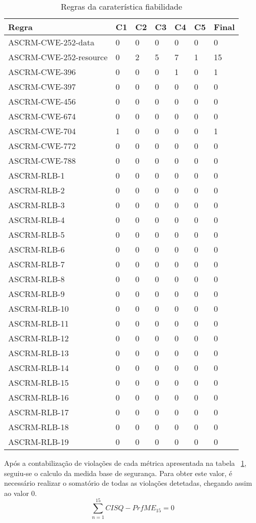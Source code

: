 \documentclass[openany,10pt,a4paper]{article}
\begin{document}
\begin{longtable}{p{1.9in}|p{0.28in}|p{0.28in}|p{0.28in}|p{0.28in}|p{0.28in}|p{0.35in}}
	\caption{Regras da caraterística fiabilidade}
	\label{table_Reliability}
	\endhead
	\hline	
		\textbf{Regra} & \textbf{C1} & \textbf{C2} & \textbf{C3} & \textbf{C4} & \textbf{C5} & \textbf{Final} \\ \hline
ASCRM-CWE-252-data & 0 & 0 & 0 & 0 & 0 & 0 \\ \hline
ASCRM-CWE-252-resource & 0 & 2 & 5 & 7 & 1 & 15 \\ \hline
ASCRM-CWE-396 & 0 & 0 & 0 & 1 & 0 & 1 \\ \hline
ASCRM-CWE-397 & 0 & 0 & 0 & 0 & 0 & 0 \\ \hline
ASCRM-CWE-456 & 0 & 0 & 0 & 0 & 0 & 0 \\ \hline
ASCRM-CWE-674 & 0 & 0 & 0 & 0 & 0 & 0 \\ \hline
ASCRM-CWE-704 & 1 & 0 & 0 & 0 & 0 & 1 \\ \hline
ASCRM-CWE-772 & 0 & 0 & 0 & 0 & 0 & 0 \\ \hline
ASCRM-CWE-788 & 0 & 0 & 0 & 0 & 0 & 0 \\ \hline
ASCRM-RLB-1 & 0 & 0 & 0 & 0 & 0 & 0 \\ \hline
ASCRM-RLB-2 & 0 & 0 & 0 & 0 & 0 & 0 \\ \hline
ASCRM-RLB-3 & 0 & 0 & 0 & 0 & 0 & 0 \\ \hline
ASCRM-RLB-4 & 0 & 0 & 0 & 0 & 0 & 0 \\ \hline
ASCRM-RLB-5 & 0 & 0 & 0 & 0 & 0 & 0 \\ \hline
ASCRM-RLB-6 & 0 & 0 & 0 & 0 & 0 & 0 \\ \hline
ASCRM-RLB-7 & 0 & 0 & 0 & 0 & 0 & 0 \\ \hline
ASCRM-RLB-8 & 0 & 0 & 0 & 0 & 0 & 0 \\ \hline
ASCRM-RLB-9 & 0 & 0 & 0 & 0 & 0 & 0 \\ \hline
ASCRM-RLB-10 & 0 & 0 & 0 & 0 & 0 & 0 \\ \hline
ASCRM-RLB-11 & 0 & 0 & 0 & 0 & 0 & 0 \\ \hline
ASCRM-RLB-12 & 0 & 0 & 0 & 0 & 0 & 0 \\ \hline
ASCRM-RLB-13 & 0 & 0 & 0 & 0 & 0 & 0 \\ \hline
ASCRM-RLB-14 & 0 & 0 & 0 & 0 & 0 & 0 \\ \hline
ASCRM-RLB-15 & 0 & 0 & 0 & 0 & 0 & 0 \\ \hline
ASCRM-RLB-16 & 0 & 0 & 0 & 0 & 0 & 0 \\ \hline
ASCRM-RLB-17 & 0 & 0 & 0 & 0 & 0 & 0 \\ \hline
ASCRM-RLB-18 & 0 & 0 & 0 & 0 & 0 & 0 \\ \hline
ASCRM-RLB-19 & 0 & 0 & 0 & 0 & 0 & 0 \\ \hline
\end{longtable} 
Após a contabilização de violações de cada métrica apresentada na tabela ~\ref{table_Reliability}, seguiu-se o calculo da medida base de segurança. Para obter este valor, é necessário realizar o somatório de todas as violações detetadas, chegando assim ao valor 0.
$$\sum_{n=1}^{15} CISQ - PrfME_{15} = 0$$
\end{document}
